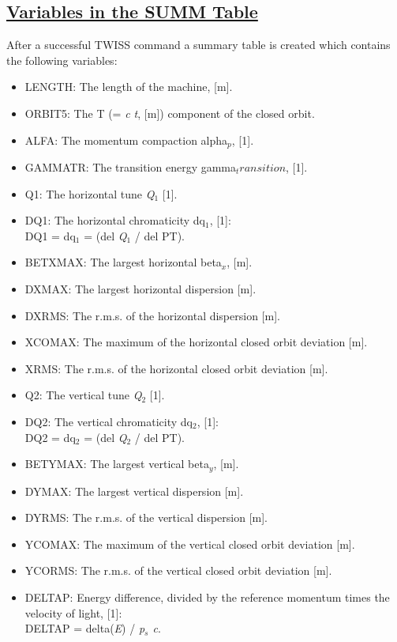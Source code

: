 \subsection{\href{summ}{Variables in the SUMM Table}} 
After a successful TWISS command a summary table is created which
contains the following variables:  
\begin{itemize}
   \item LENGTH: The length of the machine, [m].     
   \item ORBIT5: The T (= \textit{c t}, [m]) component of the closed orbit.     
   \item ALFA: The momentum compaction alpha$_p$, [1].     
   \item GAMMATR: The transition energy gamma$_transition$, [1].     
   \item Q1: The horizontal tune \textit{Q$_1$} [1].     
   \item DQ1: The horizontal chromaticity dq$_\textit{1}$, [1]:\\     
     DQ1 = dq$_\textit{1}$ = (del \textit{Q$_1$} / del PT).     
   \item BETXMAX: The largest horizontal beta$_\textit{x}$, [m].     
   \item DXMAX: The largest horizontal dispersion [m].     
   \item DXRMS: The r.m.s. of the horizontal dispersion [m].     
   \item XCOMAX: The maximum of the horizontal closed orbit deviation [m].     
   \item XRMS: The r.m.s. of the horizontal closed orbit deviation [m].     
   \item Q2: The vertical tune \textit{Q$_2$} [1].     
   \item DQ2: The vertical chromaticity dq$_\textit{2}$, [1]:\\     
     DQ2 = dq$_\textit{2}$ = (del \textit{Q$_2$} / del PT).     
   \item BETYMAX: The largest vertical beta$_\textit{y}$, [m].     
   \item DYMAX: The largest vertical dispersion [m].     
   \item DYRMS: The r.m.s. of the vertical dispersion [m].     
   \item YCOMAX: The maximum of the vertical closed orbit deviation [m].     
   \item YCORMS: The r.m.s. of the vertical closed orbit deviation [m].     
   \item DELTAP: Energy difference, divided by the reference
     momentum times the velocity of light, [1]:\\
     DELTAP = delta(\textit{E}) / \textit{p$_s$ c}.
\end{itemize} 

